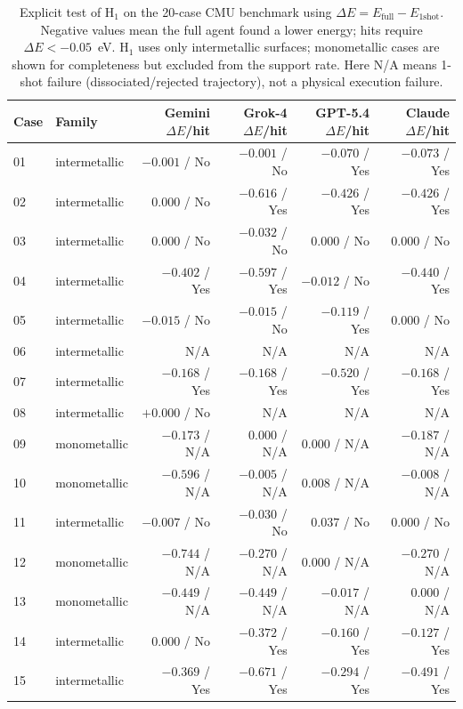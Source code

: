 \documentclass[%
 preprint,
 superscriptaddress,
 amsmath,amssymb,
 aps,
 prb,
 floatfix,
]{revtex4-2}
\begin{document}
\begin{table}[t]
\centering
\small
\caption{Explicit test of H$_1$ on the 20-case CMU benchmark using $\Delta E = E_{\mathrm{full}} - E_{\mathrm{1shot}}$. Negative values mean the full agent found a lower energy; hits require $\Delta E < -0.05$~eV. H$_1$ uses only intermetallic surfaces; monometallic cases are shown for completeness but excluded from the support rate. Here N/A means 1-shot failure (dissociated/rejected trajectory), not a physical execution failure.}
\label{tab:hypothesis-test}
\begin{tabular}{llrrrr}
\toprule
Case & Family & Gemini $\Delta E$/hit & Grok-4 $\Delta E$/hit & GPT-5.4 $\Delta E$/hit & Claude $\Delta E$/hit \\
\midrule
01 & intermetallic & $-0.001$ / No & $-0.001$ / No & $-0.070$ / Yes & $-0.073$ / Yes \\
02 & intermetallic & $0.000$ / No & $-0.616$ / Yes & $-0.426$ / Yes & $-0.426$ / Yes \\
03 & intermetallic & $0.000$ / No & $-0.032$ / No & $0.000$ / No & $0.000$ / No \\
04 & intermetallic & $-0.402$ / Yes & $-0.597$ / Yes & $-0.012$ / No & $-0.440$ / Yes \\
05 & intermetallic & $-0.015$ / No & $-0.015$ / No & $-0.119$ / Yes & $0.000$ / No \\
06 & intermetallic & N/A & N/A & N/A & N/A \\
07 & intermetallic & $-0.168$ / Yes & $-0.168$ / Yes & $-0.520$ / Yes & $-0.168$ / Yes \\
08 & intermetallic & $+0.000$ / No & N/A & N/A & N/A \\
09 & monometallic & $-0.173$ / N/A & $0.000$ / N/A & $0.000$ / N/A & $-0.187$ / N/A \\
10 & monometallic & $-0.596$ / N/A & $-0.005$ / N/A & $0.008$ / N/A & $-0.008$ / N/A \\
11 & intermetallic & $-0.007$ / No & $-0.030$ / No & $0.037$ / No & $0.000$ / No \\
12 & monometallic & $-0.744$ / N/A & $-0.270$ / N/A & $0.000$ / N/A & $-0.270$ / N/A \\
13 & monometallic & $-0.449$ / N/A & $-0.449$ / N/A & $-0.017$ / N/A & $0.000$ / N/A \\
14 & intermetallic & $0.000$ / No & $-0.372$ / Yes & $-0.160$ / Yes & $-0.127$ / Yes \\
15 & intermetallic & $-0.369$ / Yes & $-0.671$ / Yes & $-0.294$ / Yes & $-0.491$ / Yes \\

\end{tabular}
\end{table}
\end{document}
